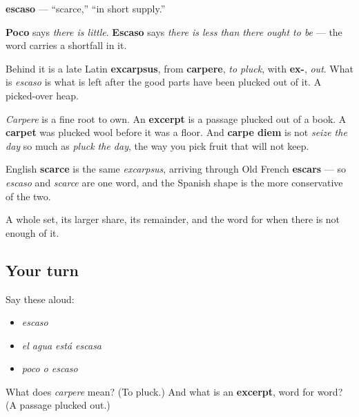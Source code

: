 \begin{cousinweb}
\textbf{escaso} — \textquotedblleft{}scarce,\textquotedblright{} \textquotedblleft{}in short supply.\textquotedblright{}

\textbf{Poco} says \emph{there is little}. \textbf{Escaso} says \emph{there is less than there ought to be} — the word carries a shortfall in it.

Behind it is a late Latin \textbf{excarpsus}, from \textbf{carpere}, \emph{to pluck}, with \textbf{ex-}, \emph{out}. What is \emph{escaso} is what is left after the good parts have been plucked out of it. A picked-over heap.

\emph{Carpere} is a fine root to own. An \textbf{excerpt} is a passage plucked out of a book. A \textbf{carpet} was plucked wool before it was a floor. And \textbf{carpe diem} is not \emph{seize the day} so much as \emph{pluck the day}, the way you pick fruit that will not keep.

English \textbf{scarce} is the same \emph{excarpsus}, arriving through Old French \textbf{escars} — so \emph{escaso} and \emph{scarce} are one word, and the Spanish shape is the more conservative of the two.
\end{cousinweb}

\begin{grammarlens}[title={What you've built}]
A whole set, its larger share, its remainder, and the word for when there is not enough of it.
\end{grammarlens}

\subsection*{Your turn}
Say these aloud:

\begin{itemize}
\raggedright
  \item \emph{escaso}
  \item \emph{el agua está escasa}
  \item \emph{poco o escaso}
\end{itemize}

\begin{tcolorbox}[breakable,colback=teal!4,colframe=teal!35!black,title={Before you move on}]
What does \emph{carpere} mean? (To pluck.) And what is an \textbf{excerpt}, word for word? (A passage plucked out.)
\end{tcolorbox}
